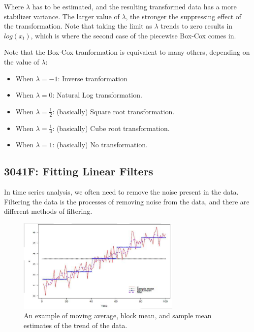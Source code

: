 \documentclass[12pt]{article}
\begin{document}
        Where $\lambda$ has to be estimated, and the resulting transformed data has a more stabilizer variance. 
        The larger value of $\lambda$, the stronger the suppressing effect of the transformation.
        Note that taking the limit as $\lambda$ trends to zero results in $log(x_t)$, which is where
        the second case of the piecewise Box-Cox comes in.

        Note that the Box-Cox tranformation is equivalent to many others, depending on the value of $\lambda$:
        \begin{itemize}
            \item When $\lambda = -1$: Inverse tranformation
            \item When $\lambda = 0$: Natural Log transformation.
            \item When $\lambda = \frac{1}{2}$: (basically) Square root transformation.
            \item When $\lambda = \frac{1}{3}$: (basically) Cube root transformation.
            \item When $\lambda = 1$: (basically) No transformation.
        \end{itemize}



    \subsection{3041F: Fitting Linear Filters}
        In time series analysis, we often need to remove the noise present in the data.
        Filtering the data is the processes of removing noise from the data, and there are different methods of filtering.
        \begin{figure}[t]
            \centering
            \includegraphics[width=8cm]{filtering_local_trends}
            \caption{An example of moving average, block mean, and sample mean estimates of
             the trend of the data.}
            \label{fig:filtering_local_trends}
        \end{figure}
\end{document}
